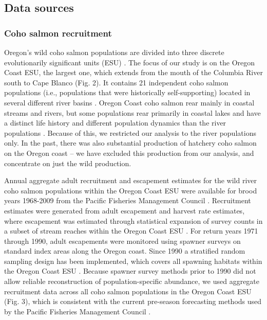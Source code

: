 \subsection{Data sources}

\subsubsection{Coho salmon recruitment}

Oregon's wild coho salmon populations are divided into three discrete
evolutionarily significant units (ESU) \citep{Weitkamp1995a, Lawson2007a}. The
focus of our study is on the Oregon Coast ESU, the largest one, which extends
from the mouth of the Columbia River south to Cape Blanco (Fig. 2). It contains
21 independent coho salmon populations (i.e., populations that were historically
self-supporting) located in several different river basins \citep{Lawson2007a}.
Oregon Coast coho salmon rear mainly in coastal streams and rivers, but some
populations rear primarily in coastal lakes and have a distinct life history and
different population dynamics than the river populations \citep{Lawson2004,
PFMC2013}. Because of this, we restricted our analysis to the river populations
only. In the past, there was also substantial production of hatchery coho salmon
on the Oregon coast -- we have excluded this production from our analysis, and
concentrate on just the wild production.

Annual aggregate adult recruitment and escapement estimates for the wild river
coho salmon populations within the Oregon Coast ESU were available for brood
years 1968-2009 from the Pacific Fisheries Management Council \citep{PFMC2013,
Rupp2012}. Recruitment estimates were generated from adult escapement and
harvest rate estimates, where escapement was estimated through statistical
expansion of survey counts in a subset of stream reaches within the Oregon Coast
ESU \citep{Lewis2010}. For return years 1971 through 1990, adult escapements
were monitored using spawner surveys on standard index areas along the Oregon
coast. Since 1990 a stratified random sampling design has been implemented,
which covers all spawning habitats within the Oregon Coast ESU
\citep{Jacobs1998, Lewis2010}. Because spawner survey methods prior to 1990 did
not allow reliable reconstruction of population-specific abundance, we used
aggregate recruitment data across all coho salmon populations in the Oregon
Coast ESU (Fig. 3), which is consistent with the current pre-season forecasting
methods used by the Pacific Fisheries Management Council \citep{PFMC2013}.

